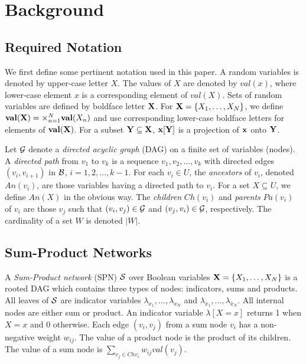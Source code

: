 \section{Background}

\subsection{Required Notation}

We first define some pertinent notation used in this paper.
A random variables is denoted by upper-case letter $X$.
The values of $X$ are denoted by $val(x)$, where lower-case element $x$ is a corresponding element of $val(X)$.
Sets of random variables are defined by boldface letter ${\bf X}$.
For ${\bf X} = \{X_1,\dots,X_N\}$, we define ${\bf val(X)} = \times^{N}_{n=1}{{\bf val}(X_n)}$ and use corresponding lower-case boldface  letters for elements of ${\bf val(X)}$.
For a subset ${\bf Y \subseteq X}$, ${\bf x[Y]}$ is a projection of ${\bf x}$ onto ${\bf Y}$.

Let ${\cal G}$ denote a \emph{directed acyclic graph} (DAG) on a finite set of variables (nodes).
A \emph{directed path} from $v_1$ to $v_k$ is a sequence $v_1, v_2, \ldots , v_k$ with directed edges $(v_i, v_{i+1})$ in ${\cal B}$, $i = 1, 2,\ldots, k-1$.
For each $v_i \in U$, the \emph{ancestors} of $v_i$, denoted $An(v_i)$, are those variables having a directed path to $v_i$.
For a set $X \subseteq U$, we define $An(X)$ in the obvious way.
The \emph{children} $Ch(v_i)$ and \emph{parents} $Pa(v_i)$ of $v_i$ are those $v_j$ such that $(v_i,v_j) \in {\cal G}$ and $(v_j,v_i) \in {\cal G}$, respectively.
The cardinality of a set $W$ is denoted $|W|$.


\subsection{Sum-Product Networks}

A \emph{Sum-Product network} (SPN) $\cal S$ over Boolean variables ${\bf X} = \{X_1,\dots,X_N\}$ is a rooted DAG which contains three types of nodes: indicators, sums and products.
All leaves of $\cal S$ are indicator variables $\lambda_{x_1},\ldots,\lambda_{x_N}$ and $\lambda_{\bar{x}_1},\ldots,\lambda_{\bar{x}_N}$.
All internal nodes are either sum or product.
An indicator variable $\lambda[X=x]$ returns 1 when $X=x$ and 0 otherwise.
Each edge $(v_i,v_j)$ from a sum node $v_i$ has a non-negative weight $w_{ij}$.
The value of a product node is the product of its children.
The value of a sum node is $\sum_{v_j \in Ch{v_i}}{w_{ij}val(v_j)}$.


